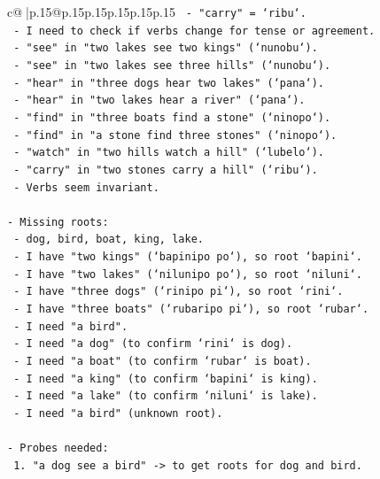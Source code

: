 \documentclass{article}
\begin{document}
{\begin{supertabular}{c@{$\;$}|p{.15\linewidth}@{}p{.15\linewidth}p{.15\linewidth}p{.15\linewidth}p{.15\linewidth}p{.15\linewidth}}
{{{\texttt{            {-} "carry" = `ribu`.} \\
\texttt{          {-} I need to check if verbs change for tense or agreement.} \\
\texttt{            {-} "see" in "two lakes see two kings" (`nunobu`).} \\
\texttt{            {-} "see" in "two lakes see three hills" (`nunobu`).} \\
\texttt{            {-} "hear" in "three dogs hear two lakes" (`pana`).} \\
\texttt{            {-} "hear" in "two lakes hear a river" (`pana`).} \\
\texttt{            {-} "find" in "three boats find a stone" (`ninopo`).} \\
\texttt{            {-} "find" in "a stone find three stones" (`ninopo`).} \\
\texttt{            {-} "watch" in "two hills watch a hill" (`lubelo`).} \\
\texttt{            {-} "carry" in "two stones carry a hill" (`ribu`).} \\
\texttt{            {-} Verbs seem invariant.} \\
\\ 
\texttt{{-} Missing roots:} \\
\texttt{  {-} dog, bird, boat, king, lake.} \\
\texttt{  {-} I have "two kings" (`bapinipo po`), so root `bapini`.} \\
\texttt{  {-} I have "two lakes" (`nilunipo po`), so root `niluni`.} \\
\texttt{  {-} I have "three dogs" (`rinipo pi`), so root `rini`.} \\
\texttt{  {-} I have "three boats" (`rubaripo pi`), so root `rubar`.} \\
\texttt{  {-} I need "a bird".} \\
\texttt{  {-} I need "a dog" (to confirm `rini` is dog).} \\
\texttt{  {-} I need "a boat" (to confirm `rubar` is boat).} \\
\texttt{  {-} I need "a king" (to confirm `bapini` is king).} \\
\texttt{  {-} I need "a lake" (to confirm `niluni` is lake).} \\
\texttt{  {-} I need "a bird" (unknown root).} \\
\\ 
\texttt{{-} Probes needed:} \\
\texttt{  1. "a dog see a bird" {-}> to get roots for dog and bird.} \\
}}}
\end{supertabular}}
\end{document}

